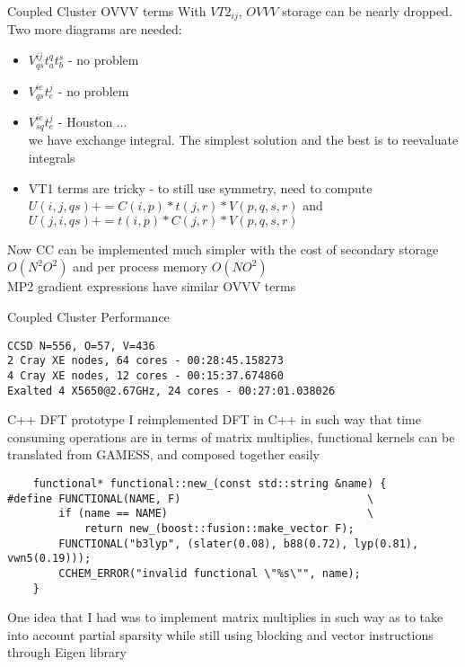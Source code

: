 \documentclass{beamer}
\begin{document}
\begin{frame}{Coupled Cluster OVVV terms}
  With $VT2_{ij}$, $OVVV$ storage can be nearly dropped.
  Two more diagrams are needed:
  \begin{itemize}
    \item $V^{ij}_{qs} t^{q}_a t^{s}_b$ - no problem
  \item $V^{ie}_{qs} t_{e}^j$ - no problem
  \item $V^{ie}_{sq} t_{e}^j$ - Houston ... \\
    we have exchange integral.  The simplest solution and the best is
    to reevaluate integrals
  \item VT1 terms are tricky - to still use symmetry, need to compute
    $U(i,j,qs) += C(i,p)*t(j,r)*V(p,q,s,r)$ and $U(j,i,qs) += t(i,p)*C(j,r)*V(p,q,s,r)$
  \end{itemize}
Now CC can be implemented much simpler with the cost of secondary
storage $O(N^2O^2)$ and per process memory $O(NO^2)$\\
MP2 gradient expressions have similar OVVV terms
\end{frame}

\begin{frame}[fragile]{Coupled Cluster Performance}
\begin{verbatim}
CCSD N=556, O=57, V=436 
2 Cray XE nodes, 64 cores - 00:28:45.158273
4 Cray XE nodes, 12 cores - 00:15:37.674860
Exalted 4 X5650@2.67GHz, 24 cores - 00:27:01.038026
\end{verbatim}
\end{frame}
 
\begin{frame}[fragile]{ C++ DFT prototype}
  I reimplemented DFT in C++ in such way that time consuming
  operations are in terms of matrix multiplies, functional kernels can
  be translated from GAMESS, and composed together easily

\begin{lstlisting}
    functional* functional::new_(const std::string &name) {
#define FUNCTIONAL(NAME, F)                             \
        if (name == NAME)                               \
            return new_(boost::fusion::make_vector F);
        FUNCTIONAL("b3lyp", (slater(0.08), b88(0.72), lyp(0.81), vwn5(0.19)));
        CCHEM_ERROR("invalid functional \"%s\"", name);
    }
\end{lstlisting}

One idea that I had was to implement matrix multiplies in such way as
to take into account partial sparsity while still using blocking and
vector instructions through Eigen library
\end{frame}
\end{document}
